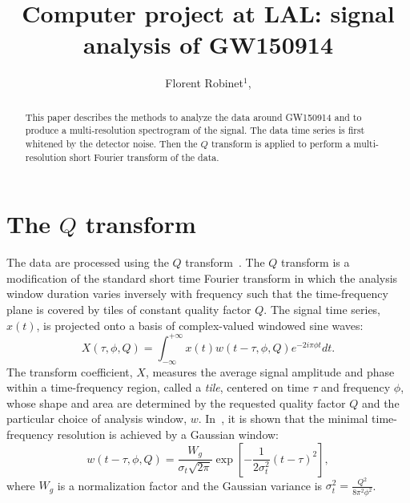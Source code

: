\documentclass[aps]{revtex4-1}
\begin{document}

\title{Computer project at LAL: signal analysis of GW150914}

\begin{abstract}
  This paper describes the methods to analyze the data around GW150914 and to produce a multi-resolution spectrogram of the signal. The data time series is first whitened by the detector noise. Then the $Q$ transform is applied to perform a multi-resolution short Fourier transform of the data.
\end{abstract}

\author{
  Florent Robinet$^1$,  
}
        
\address{$^1$LAL, Univ. Paris-Sud, CNRS/IN2P3, Université Paris-Saclay, Orsay, France}

\maketitle

\tableofcontents

\section{The $Q$ transform} \label{sec:qtransform}
The data are processed using the $Q$ transform~\cite{Brown:1991}. The $Q$ transform is a modification of the standard short time Fourier transform in which the analysis window duration varies inversely with frequency such that the time-frequency plane is covered by tiles of constant quality factor $Q$. The signal time series, $x(t)$, is projected onto a basis of complex-valued windowed sine waves:
\begin{equation}
  X(\tau, \phi, Q) = \int_{-\infty}^{+\infty}{ x(t) w(t-\tau,\phi,Q) e^{-2i\pi\phi t}dt}.
  \label{eq:qtransform1}
\end{equation}
The transform coefficient, $X$, measures the average signal amplitude and phase within a time-frequency region, called a \textit{tile}, centered on time $\tau$ and frequency $\phi$, whose shape and area are determined by the requested quality factor $Q$ and the particular choice of analysis window, $w$. In~\cite{Gabor:1946}, it is shown that the minimal time-frequency resolution is achieved by a Gaussian window:
\begin{equation}
  w(t-\tau,\phi,Q) = \frac{W_g}{\sigma_t\sqrt{2\pi}}\exp\left [ -\frac{1}{2\sigma_t^2}(t-\tau)^2 \right],
  \label{eq:gausswindowt}
\end{equation}
where $W_g$ is a normalization factor and the Gaussian variance is $\sigma_t^2=\frac{Q^2}{8\pi^2\phi^2}$.
\end{document}
